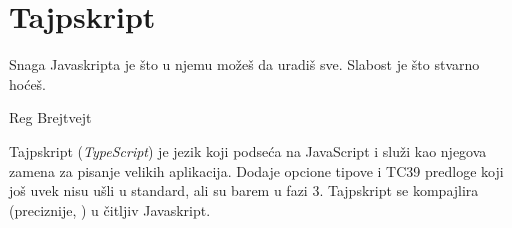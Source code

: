 \chapter{Tajpskript}

\epigraph{
  Snaga Javaskripta je što u njemu možeš da uradiš sve.
  Slabost je što stvarno hoćeš.
}{Reg Brejtvejt}

Tajpskript (\textsl{TypeScript}) je jezik koji podseća na JavaScript i služi kao njegova zamena za pisanje velikih aplikacija.
Dodaje opcione tipove i TC39 predloge koji još uvek nisu ušli u standard, ali su barem u fazi 3.
Tajpskript se kompajlira (preciznije, ) u čitljiv Javaskript.






